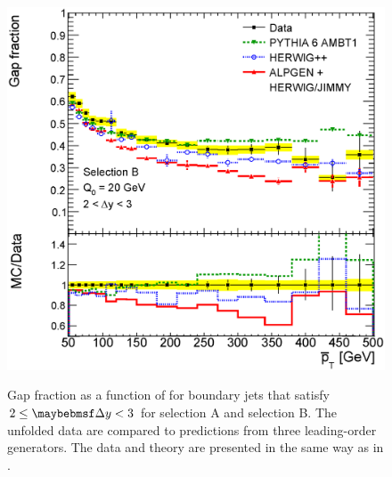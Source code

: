 \begin{figure}[htpb]
{    \includegraphics[width=\smallfigwidth]{chapters/gbj/GapFraction_PtBardist_MC_selB.eps}
    \label{fig:gbj:mc_gap_fraction_pTbar_B}}
  \caption{Gap fraction as a function of \pTbar for boundary jets that satisfy $2 \leq \DeltaY < 3$
           for \protect{} selection A and \protect{}
           selection B. The unfolded data are compared
           to predictions from three leading-order \MC generators. The data and theory
           are presented in the same way as in .}
  \label{fig:gbj:mc_gap_fraction_pTbar}
\end{figure}

